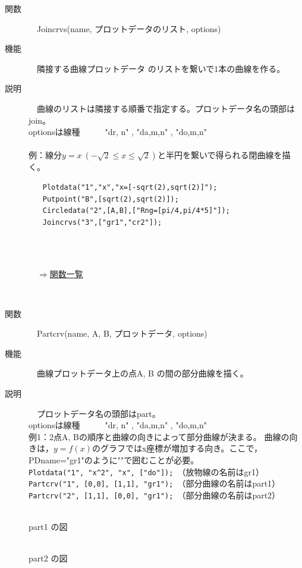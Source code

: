 \documentclass[papersize,a4paper,12pt,uplatex]{jsarticle}
\begin{document}
\begin{description}
\hypertarget{joincrvs}{}
\item[関数]　Joincrvs(name, プロットデータのリスト, options) 
\item[機能]　隣接する曲線プロットデータ のリストを繋いで1本の曲線を作る。
\item[説明]　曲線のリストは隣接する順番で指定する。プロットデータ名の頭部はjoin。\\
optionsは線種　　　"dr, n"  , "da,m,n" , "do,m,n"\\
　\\
例：線分$y=x\ (-\sqrt{2} \leq x \leq \sqrt{2})$と半円を繋いで得られる閉曲線を描く。\\
\begin{verbatim}
　　Plotdata("1","x","x=[-sqrt(2),sqrt(2)]");
　　Putpoint("B",[sqrt(2),sqrt(2)]);
　　Circledata("2",[A,B],["Rng=[pi/4,pi/4*5]"]);
　　Joincrvs("3",["gr1","cr2"]);
\end{verbatim}
　\\
　　　　　　　　

\begin{flushright}　\hyperlink{functionlist}{$\Rightarrow$関数一覧}\end{flushright}
　\\
\hypertarget{partcrv}{}
\item[関数]　Partcrv(name, A, B, プロットデータ, options) 
\item[機能]　曲線プロットデータ上の点A, B の間の部分曲線を描く。
\item[説明]　プロットデータ名の頭部はpart。\\
optionsは線種　　　"dr, n"  , "da,m,n" , "do,m,n"\\

例1：2点A, Bの順序と曲線の向きによって部分曲線が決まる。
曲線の向きは，$y=f(x)$のグラフではx座標が増加する向き。ここで，PDname="gr1"のように""で囲むことが必要。\\
    \verb|Plotdata("1", "x^2", "x", ["do"]);|　（放物線の名前はgr1）\\
    \verb|Partcrv("1", [0,0], [1,1], "gr1");|　（部分曲線の名前はpart1）\\
    \verb|Partcrv("2", [1,1], [0,0], "gr1");|　（部分曲線の名前はpart2）\\

\begin{minipage}{35mm}
\begin{center}
\\
part1 の図
\end{center}
\end{minipage}
\hspace{10mm}
\begin{minipage}{35mm}
\begin{center}
\\
part2 の図
\end{center}
\end{minipage}
\vspace{5mm}


\end{description}
\end{document}
